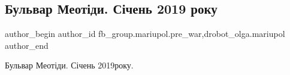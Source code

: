  
 
 
 
 

\subsection{Бульвар Меотіди. Січень 2019 року}
\label{sec:15_02_2023.fb.fb_group.mariupol.pre_war.6.bulvar_meot_di__s_ch}
 
\ifcmt
 author_begin
   author_id fb_group.mariupol.pre_war,drobot_olga.mariupol
 author_end
\fi

Бульвар Меотіди. Січень 2019року.

